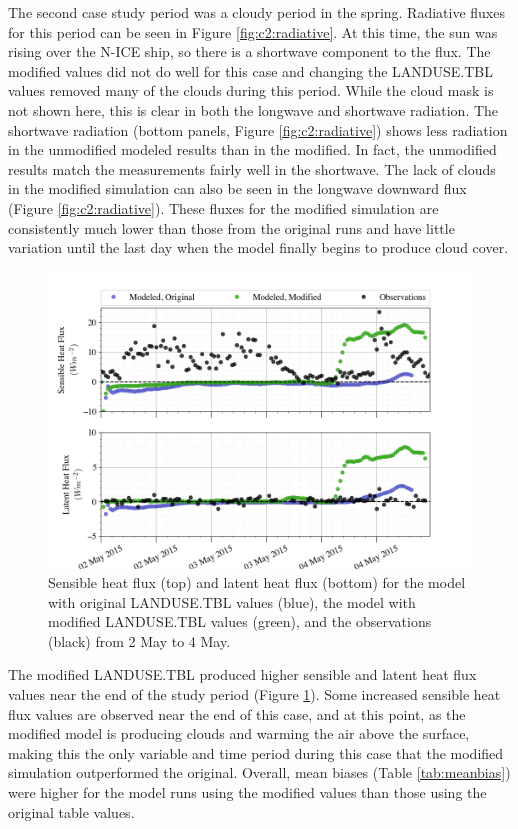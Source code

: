 The second case study period was a cloudy period in the spring. Radiative fluxes for this period can be seen in Figure \ref{fig:c2:radiative}. At this time, the sun was rising over the N-ICE ship, so there is a shortwave component to the flux. The modified values did not do well for this case and changing the LANDUSE.TBL values removed many of the clouds during this period. While the cloud mask is not shown here, this is clear in both the longwave and shortwave radiation. The shortwave radiation (bottom panels, Figure \ref{fig:c2:radiative}) shows less radiation in the unmodified modeled results than in the modified. In fact, the unmodified results match the measurements fairly well in the shortwave. The lack of clouds in the modified simulation can also be seen in the longwave downward flux (Figure \ref{fig:c2:radiative}). These fluxes for the modified simulation are consistently much lower than those from the original runs and have little variation until the last day when the model finally begins to produce cloud cover. 

\begin{figure}[t]
    \centering
    \includegraphics[width=1\linewidth]{figures/chapter6/case2_sensible_latent.png}
    \caption[Idealized Case 2 - Latent and sensible heat fluxes.]{Sensible heat flux (top) and latent heat flux (bottom) for the model with original LANDUSE.TBL values (blue), the model with modified LANDUSE.TBL values (green), and the observations (black) from 2 May to 4 May.}
    \label{fig:c2:heat}
\end{figure}

The modified LANDUSE.TBL produced higher sensible and latent heat flux values near the end of the study period (Figure \ref{fig:c2:heat}). Some increased sensible heat flux values are observed near the end of this case, and at this point, as the modified model is producing clouds and warming the air above the surface, making this the only variable and time period during this case that the modified simulation outperformed the original. Overall, mean biases (Table \ref{tab:meanbias}) were higher for the model runs using the modified values than those using the original table values.

